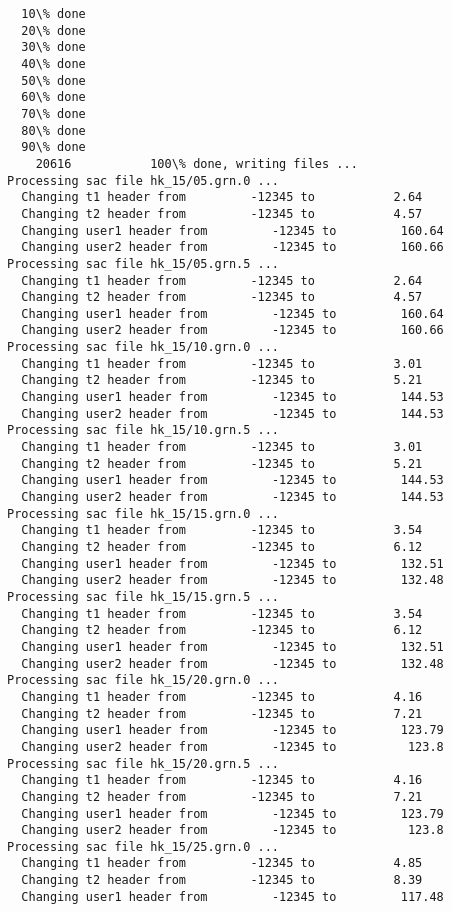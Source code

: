 \documentclass[11pt,titlepage,fleqn]{article}
\begin{document}
\begin{enumerate}
\begin{verbatim}
  10\% done
  20\% done
  30\% done
  40\% done
  50\% done
  60\% done
  70\% done
  80\% done
  90\% done
    20616           100\% done, writing files ... 
Processing sac file hk_15/05.grn.0 ...
  Changing t1 header from         -12345 to           2.64
  Changing t2 header from         -12345 to           4.57
  Changing user1 header from         -12345 to         160.64
  Changing user2 header from         -12345 to         160.66
Processing sac file hk_15/05.grn.5 ...
  Changing t1 header from         -12345 to           2.64
  Changing t2 header from         -12345 to           4.57
  Changing user1 header from         -12345 to         160.64
  Changing user2 header from         -12345 to         160.66
Processing sac file hk_15/10.grn.0 ...
  Changing t1 header from         -12345 to           3.01
  Changing t2 header from         -12345 to           5.21
  Changing user1 header from         -12345 to         144.53
  Changing user2 header from         -12345 to         144.53
Processing sac file hk_15/10.grn.5 ...
  Changing t1 header from         -12345 to           3.01
  Changing t2 header from         -12345 to           5.21
  Changing user1 header from         -12345 to         144.53
  Changing user2 header from         -12345 to         144.53
Processing sac file hk_15/15.grn.0 ...
  Changing t1 header from         -12345 to           3.54
  Changing t2 header from         -12345 to           6.12
  Changing user1 header from         -12345 to         132.51
  Changing user2 header from         -12345 to         132.48
Processing sac file hk_15/15.grn.5 ...
  Changing t1 header from         -12345 to           3.54
  Changing t2 header from         -12345 to           6.12
  Changing user1 header from         -12345 to         132.51
  Changing user2 header from         -12345 to         132.48
Processing sac file hk_15/20.grn.0 ...
  Changing t1 header from         -12345 to           4.16
  Changing t2 header from         -12345 to           7.21
  Changing user1 header from         -12345 to         123.79
  Changing user2 header from         -12345 to          123.8
Processing sac file hk_15/20.grn.5 ...
  Changing t1 header from         -12345 to           4.16
  Changing t2 header from         -12345 to           7.21
  Changing user1 header from         -12345 to         123.79
  Changing user2 header from         -12345 to          123.8
Processing sac file hk_15/25.grn.0 ...
  Changing t1 header from         -12345 to           4.85
  Changing t2 header from         -12345 to           8.39
  Changing user1 header from         -12345 to         117.48

\end{verbatim}
\end{enumerate}
\end{document}
